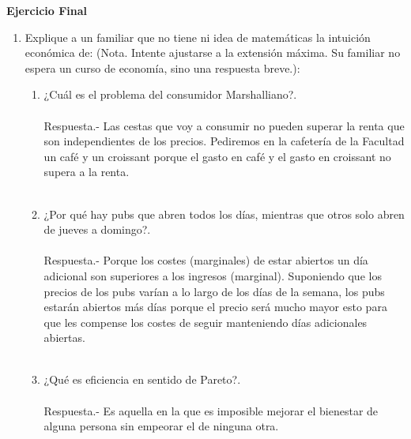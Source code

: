 \begin{center}
    \textbf{\Large Ejercicio Final}
\end{center}
\vspace{1cm}

\begin{enumerate}

\item Explique a un familiar que no tiene ni idea de matemáticas la intuición económica de: (Nota. Intente ajustarse a la extensión máxima. Su familiar no espera un curso de economía, sino una respuesta breve.):

    \begin{enumerate}[\bfseries 1.]

	\item ¿Cuál es el problema del consumidor Marshalliano?.\\\\
	    Respuesta.-\; Las cestas que voy a consumir no pueden superar la renta que son independientes de los precios. Pediremos en la cafetería de la Facultad un café y un croissant porque el gasto en café y el gasto en croissant no supera a la renta.\\\\

	\item  ¿Por qué hay pubs que abren todos los días, mientras que otros solo abren de jueves a domingo?.\\\\
	    Respuesta.-\; Porque los costes (marginales) de estar abiertos un día adicional son superiores a los ingresos (marginal). Suponiendo que los precios de los pubs varían a lo largo de los días de la semana, los pubs estarán abiertos más días porque el precio será mucho mayor esto para que les compense los costes de seguir manteniendo días adicionales abiertas.\\\\

	\item  ¿Qué es eficiencia en sentido de Pareto?.\\\\
	    Respuesta.-\; Es aquella en la que es imposible mejorar el bienestar de alguna persona sin empeorar el de ninguna otra.\\\\

    \end{enumerate}


\end{enumerate}
